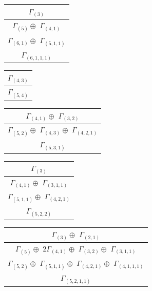 \documentclass[main.tex]{subfiles}
\begin{document}
\begin{minipage}{.2\textwidth}
\centering
\begin{tabular}{c}
$\Gamma_{(
3
)}$
\\ \hline
$\Gamma_{(
5
)} \oplus$
$\Gamma_{(
4 , 
1
)}$
\\ \hline
$\Gamma_{(
6 , 
1
)} \oplus$
$\Gamma_{(
5 , 
1 , 
1
)}$
\\ \hline
$\Gamma_{(
6 , 
1 , 
1 , 
1
)}$
\\
\end{tabular}\end{minipage}
\begin{minipage}{.2\textwidth}
\centering
\begin{tabular}{c}
$\Gamma_{(
4 , 
3
)}$
\\ \hline
$\Gamma_{(
5 , 
4
)}$
\\
\end{tabular}\end{minipage}
\begin{minipage}{.3\textwidth}
\centering
\begin{tabular}{c}
$\Gamma_{(
4 , 
1
)} \oplus$
$\Gamma_{(
3 , 
2
)}$
\\ \hline
$\Gamma_{(
5 , 
2
)} \oplus$
$\Gamma_{(
4 , 
3
)} \oplus$
$\Gamma_{(
4 , 
2 , 
1
)}$
\\ \hline
$\Gamma_{(
5 , 
3 , 
1
)}$
\\
\end{tabular}\end{minipage}
\bigskip
\begin{minipage}{.3\textwidth}
\centering
\begin{tabular}{c}
$\Gamma_{(
3
)}$
\\ \hline
$\Gamma_{(
4 , 
1
)} \oplus$
$\Gamma_{(
3 , 
1 , 
1
)}$
\\ \hline
$\Gamma_{(
5 , 
1 , 
1
)} \oplus$
$\Gamma_{(
4 , 
2 , 
1
)}$
\\ \hline
$\Gamma_{(
5 , 
2 , 
2
)}$
\\
\end{tabular}\end{minipage}
\begin{minipage}{.4\textwidth}
\centering
\begin{tabular}{c}
$\Gamma_{(
3
)} \oplus$
$\Gamma_{(
2 , 
1
)}$
\\ \hline
$\Gamma_{(
5
)} \oplus$
$2\Gamma_{(
4 , 
1
)} \oplus$
$\Gamma_{(
3 , 
2
)} \oplus$
$\Gamma_{(
3 , 
1 , 
1
)}$
\\ \hline
$\Gamma_{(
5 , 
2
)} \oplus$
$\Gamma_{(
5 , 
1 , 
1
)} \oplus$
$\Gamma_{(
4 , 
2 , 
1
)} \oplus$
$\Gamma_{(
4 , 
1 , 
1 , 
1
)}$
\\ \hline
$\Gamma_{(
5 , 
2 , 
1 , 
1
)}$
\\
\end{tabular}\end{minipage}
\end{document}
